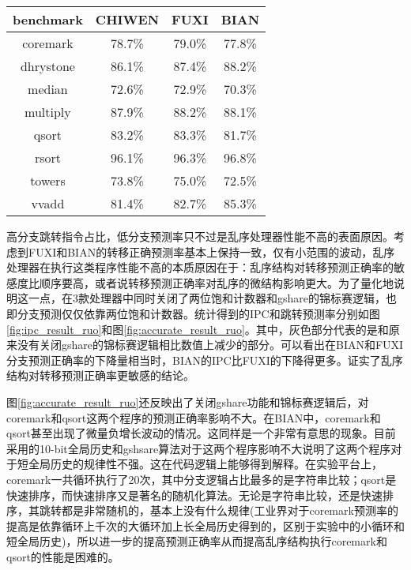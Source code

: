 \begin{table}[!htbp]
	\label{tab:accurate_result_ruo}
	\centering
	\footnotesize%
	\setlength{\tabcolsep}{4pt}%
	\renewcommand{\arraystretch}{1.2}%
	\begin{tabular}{cccc}
		\hline
		benchmark & CHIWEN & FUXI & BIAN \\%
		\hline
		coremark    & 78.7\% & 79.0\% & 77.8\% \\
		dhrystone   & 86.1\% & 87.4\% & 88.2\% \\
		median 		& 72.6\% & 72.9\% & 70.3\% \\
		multiply 	& 87.9\% & 88.2\% & 88.1\% \\
		qsort  		& 83.2\% & 83.3\% & 81.7\% \\
		rsort  		& 96.1\% & 96.3\% & 96.8\% \\
		towers 		& 73.8\% & 75.0\% & 72.5\% \\
		vvadd 		& 81.4\% & 82.7\% & 85.3\% \\
		\hline
	\end{tabular}
\end{table}

高分支跳转指令占比，低分支预测率只不过是乱序处理器性能不高的表面原因。考虑到FUXI和BIAN的转移正确预测率基本上保持一致，仅有小范围的波动，乱序处理器在执行这类程序性能不高的本质原因在于：乱序结构对转移预测正确率的敏感度比顺序要高，或者说转移预测正确率对乱序的微结构影响更大。为了量化地说明这一点，在3款处理器中同时关闭了两位饱和计数器和gshare的锦标赛逻辑，也即分支预测仅仅依靠两位饱和计数器。统计得到的IPC和跳转预测率分别如图\ref{fig:ipc_result_ruo}和图\ref{fig:accurate_result_ruo}。其中，灰色部分代表的是和原来没有关闭gshare的锦标赛逻辑相比数值上减少的部分。可以看出在BIAN和FUXI分支预测正确率的下降量相当时，BIAN的IPC比FUXI的下降得更多。证实了乱序结构对转移预测正确率更敏感的结论。

图\ref{fig:accurate_result_ruo}还反映出了关闭gshare功能和锦标赛逻辑后，对coremark和qsort这两个程序的预测正确率影响不大。在BIAN中，coremark和qsort甚至出现了微量负增长波动的情况。这同样是一个非常有意思的现象。目前采用的10-bit全局历史和gshsare算法对于这两个程序影响不大说明了这两个程序对于短全局历史的规律性不强。这在代码逻辑上能够得到解释。在实验平台上，coremark一共循环执行了20次，其中分支逻辑占比最多的是字符串比较；qsort是快速排序，而快速排序又是著名的随机化算法。无论是字符串比较，还是快速排序，其跳转都是非常随机的，基本上没有什么规律(工业界对于coremark预测率的提高是依靠循环上千次的大循环加上长全局历史得到的，区别于实验中的小循环和短全局历史)，所以进一步的提高预测正确率从而提高乱序结构执行coremark和qsort的性能是困难的。

